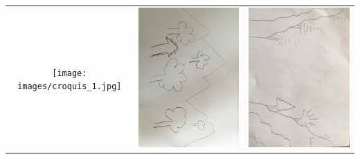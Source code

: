 \documentclass[a4paper, 12pt]{book}
\begin{document}
\begin{center}
  \centering
  \begin{tabular}{ccc}
    \texttt{[image: images/croquis\_1.jpg]}&
    \includegraphics[angle=90, height=0.15\textheight]{images/croquis_2.jpg}&
    \includegraphics[angle=90, height=0.15\textheight]{images/croquis_4.jpg}\\

\end{tabular}
\end{center}
\end{document}
